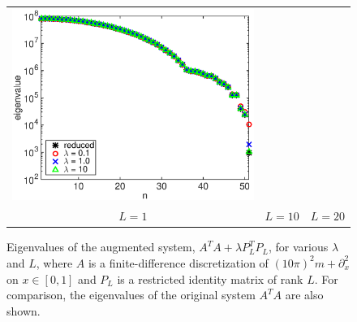 \documentclass{iopart}
\begin{document}
\begin{figure}
\begin{tabular}{ccc}
\includegraphics[scale=.2]{./figs/example3_c}\\
{\small $L = 1$}&{\small $L = 10$}&{\small $L = 20$}\\
\end{tabular}
\caption{Eigenvalues of the augmented system,  $A^T\!A + \lambda P_L^T\!P_L$, for various $\lambda$ and $L$, where $A$ is a finite-difference discretization of $(10\pi)^2 m + \partial_x^2$ on $x\in [0,1]$
and $P_L$ is a restricted identity matrix of rank $L$. For comparison, the eigenvalues of the original system $A^T\!A$ are also shown.}
\label{fig:example3}
\end{figure}
\end{document}

